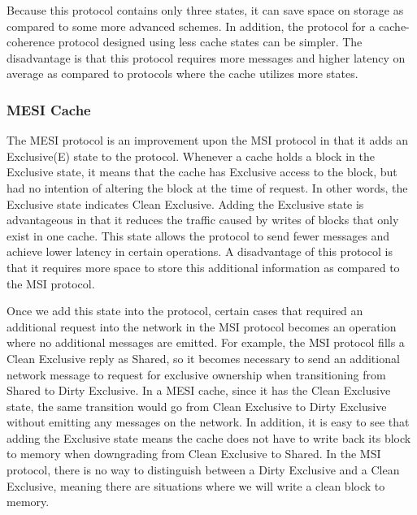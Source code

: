 \documentclass[letterpaper]{article}
\begin{document}
Because this protocol contains only three states, it can save space on storage as compared to some more advanced schemes. In addition, the protocol for a cache-coherence protocol designed using less cache states can be simpler. The disadvantage is that this protocol requires more messages and higher latency on average as compared to protocols where the cache utilizes more states.

\subsubsection{MESI Cache}
The MESI protocol is an improvement upon the MSI protocol in that it adds an Exclusive(E) state to the protocol. Whenever a cache holds a block in the Exclusive state, it means that the cache has Exclusive access to the block, but had no intention of altering the block at the time of request. In other words, the Exclusive state indicates Clean Exclusive. Adding the Exclusive state is advantageous in that it reduces the traffic caused by writes of blocks that only exist in one cache. This state allows the protocol to send fewer messages and achieve lower latency in certain operations. A disadvantage of this protocol is that it requires more space to store this additional information as compared to the MSI protocol.

Once we add this state into the protocol, certain cases that required an additional request into the network in the MSI protocol becomes an operation where no additional messages are emitted. For example, the MSI protocol fills a Clean Exclusive reply as Shared, so it becomes necessary to send an additional network message to request for exclusive ownership when transitioning from Shared to Dirty Exclusive. In a MESI cache, since it has the Clean Exclusive state, the same transition would go from Clean Exclusive to Dirty Exclusive without emitting any messages on the network. In addition, it is easy to see that adding the Exclusive state means the cache does not have to write back its block to memory when downgrading from Clean Exclusive to Shared. In the MSI protocol, there is no way to distinguish between a Dirty Exclusive and a Clean Exclusive, meaning there are situations where we will write a clean block to memory. 
\end{document}
